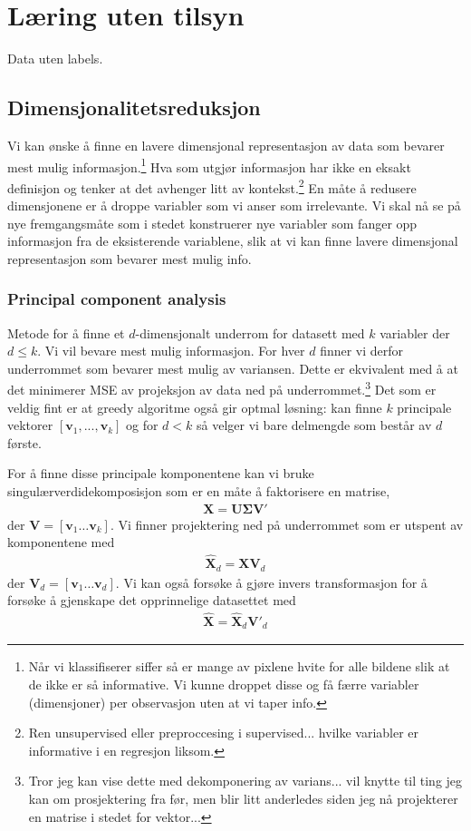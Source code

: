 \chapter{Læring uten tilsyn}
Data uten labels.
\section{Dimensjonalitetsreduksjon}
Vi kan ønske å finne en lavere dimensjonal representasjon av data som bevarer mest mulig informasjon.\footnote{Når vi klassifiserer siffer så er mange av pixlene hvite for alle bildene slik at de ikke er så informative. Vi kunne droppet disse og få færre variabler (dimensjoner) per observasjon uten at vi taper info.} Hva som utgjør informasjon har ikke en eksakt definisjon og tenker at det avhenger litt av kontekst.\footnote{Ren unsupervised eller preproccesing i supervised... hvilke variabler er informative i en regresjon liksom.} En måte å redusere dimensjonene er å droppe variabler som vi anser som irrelevante. Vi skal nå se på nye fremgangsmåte som i stedet konstruerer nye variabler som fanger opp informasjon fra de eksisterende variablene, slik at vi kan finne lavere dimensjonal representasjon som bevarer mest mulig info.
\subsection{Principal component analysis}
Metode for å finne et $d$-dimensjonalt underrom for datasett med $k$ variabler der $d \leq k$. Vi vil bevare mest mulig informasjon. For hver $d$ finner vi derfor underrommet som bevarer mest mulig av variansen. Dette er ekvivalent med å at det minimerer MSE av projeksjon av data ned på underrommet.\footnote{Tror jeg kan vise dette med dekomponering av varians... vil knytte til ting jeg kan om prosjektering fra før, men blir litt anderledes siden jeg nå projekterer en matrise i stedet for vektor...} Det som er veldig fint er at greedy algoritme også gir optmal løsning: kan finne $k$ principale vektorer $[\mathbf{v}_1, ..., \mathbf{v}_k]$ og for $d < k$ så velger vi bare delmengde som består av $d$ første. 

For å finne disse principale komponentene kan vi bruke singulærverdidekomposisjon som er en måte å faktorisere en matrise,
\begin{align}
\mathbf{X} = \mathbf{U}\mathbf{\Sigma}\mathbf{V}'
\end{align}
der $\mathbf{V} = [\mathbf{v}_1 \ldots \mathbf{v}_k]$. Vi finner projektering ned på underrommet som er utspent av komponentene med
\begin{align}
\hat{\mathbf{X}}_d = \mathbf{X}\mathbf{V}_d
\end{align}
der $\mathbf{V}_d = [\mathbf{v}_1 \ldots \mathbf{v}_d]$. Vi kan også forsøke å gjøre invers transformasjon for å forsøke å gjenskape det opprinnelige datasettet med 
\begin{align}
\hat{\mathbf{X}} = \hat{\mathbf{X}}_d \mathbf{V}'_d
\end{align}

